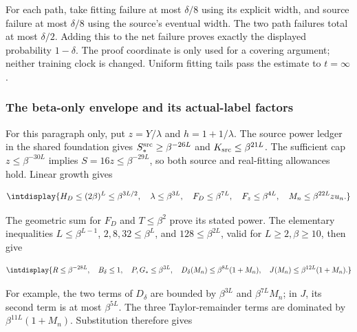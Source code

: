 
For each path, take fitting failure at most \(\delta/8\) using its explicit width, and source failure at most \(\delta/8\) using the source's eventual width. The two path failures total at most \(\delta/2\). Adding this to the net failure proves exactly the displayed probability \(1-\delta\). The proof coordinate is only used for a covering argument; neither training clock is changed. Uniform fitting tails pass the estimate to \(t=\infty\).


\subsubsection{The beta-only envelope and its actual-label factors}



For this paragraph only, put \(z=Y/\lambda\) and \(h=1+1/\lambda\). The source power ledger in the shared foundation gives \(S_*^{\rm src}\ge\beta^{-26L}\) and \(K_{\rm src}\le\beta^{21L}\). The sufficient cap \(z\le\beta^{-30L}\) implies \(S=16z\le\beta^{-29L}\), so both source and real-fitting allowances hold. Linear growth gives


\begingroup\renewcommand{\theHequation}{intdisplay.473}
\begin{equation*}
\intdisplay{
H_D\le(2\beta)^L\le\beta^{3L/2},\quad
\lambda\le\beta^{3L},\quad F_D\le\beta^{7L},\quad
F_z\le\beta^{4L},\quad M_n\le\beta^{22L}zu_n.
}
\end{equation*}
\endgroup


The geometric sum for \(F_D\) and \(T\le\beta^2\) prove its stated power. The elementary inequalities \(L\le\beta^{L-1}\), \(2,\allowbreak 8,\allowbreak 32\le\beta^L\), and \(128\le\beta^{2L}\), valid for \(L\ge2,\allowbreak \beta\ge10\), then give


\begingroup\renewcommand{\theHequation}{intdisplay.474}
\begin{equation*}
\intdisplay{
R\le\beta^{-28L},\quad B_\delta\le1,\quad
P,G_*\le\beta^{3L},\quad
D_\delta(M_n)\le\beta^{8L}(1+M_n),\quad
J(M_n)\le\beta^{12L}(1+M_n).
}
\end{equation*}
\endgroup


For example, the two terms of \(D_\delta\) are bounded by \(\beta^{3L}\) and \(\beta^{7L}M_n\); in \(J\), its second term is at most \(\beta^{5L}\). The three Taylor-remainder terms are dominated by \(\beta^{11L}(1+M_n)\). Substitution therefore gives


